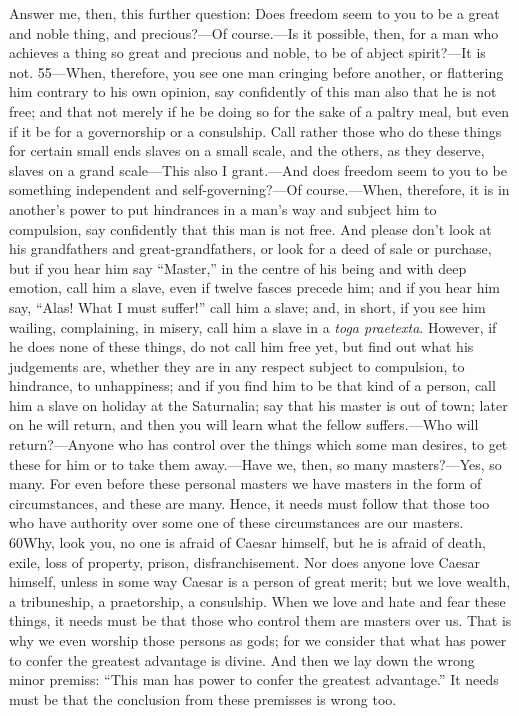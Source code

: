 Answer me, then, this further question: Does freedom seem to you to be a great and noble thing, and precious?—Of course.—Is it possible, then, for a man who achieves a thing so great and precious and noble, to be of abject spirit?—It is not. 55—When, therefore, you see one man cringing before another, or flattering him contrary to his own opinion, say confidently of this man also that he is not free; and that not merely if he be doing so for the sake of a paltry meal, but even if it be for a governorship or a consulship. Call rather those who do these things for certain small ends slaves on a small scale, and the others, as they deserve, slaves on a grand scale—This also I grant.—And does freedom seem to you to be something independent and self-governing?—Of course.—When, therefore, it is in another's power to put hindrances in a man's way and subject him to compulsion, say confidently that this man is not free. And please don't look at his grandfathers and great-grandfathers, or look for a deed of sale or purchase, but if you hear him say ``Master,'' in the centre of his being and with deep emotion, call him a slave, even if twelve fasces precede him; and if you hear him say, ``Alas! What I must suffer!'' call him a slave; and, in short, if you see him wailing, complaining, in misery, call him a slave in a \emph{toga praetexta}. However, if he does none of these things, do not call him free yet, but find out what his judgements are, whether they are in any respect subject to compulsion, to hindrance, to unhappiness; and if you find him to be that kind of a person, call him a slave on holiday at the Saturnalia; say that his master is out of town; later on he will return, and then you will learn what the fellow suffers.—Who will return?—Anyone who has control over the things which some man desires, to get these for him or to take them away.—Have we, then, so many masters?—Yes, so many. For even before these personal masters we have masters in the form of circumstances, and these are many. Hence, it needs must follow that those too who have authority over some one of these circumstances are our masters. 60Why, look you, no one is afraid of Caesar himself, but he is afraid of death, exile, loss of property, prison, disfranchisement. Nor does anyone love Caesar himself, unless in some way Caesar is a person of great merit; but we love wealth, a tribuneship, a praetorship, a consulship. When we love and hate and fear these things, it needs must be that those who control them are masters over us. That is why we even worship those persons as gods; for we consider that what has power to confer the greatest advantage is divine. And then we lay down the wrong minor premiss: ``This man has power to confer the greatest advantage.'' It needs must be that the conclusion from these premisses is wrong too.

